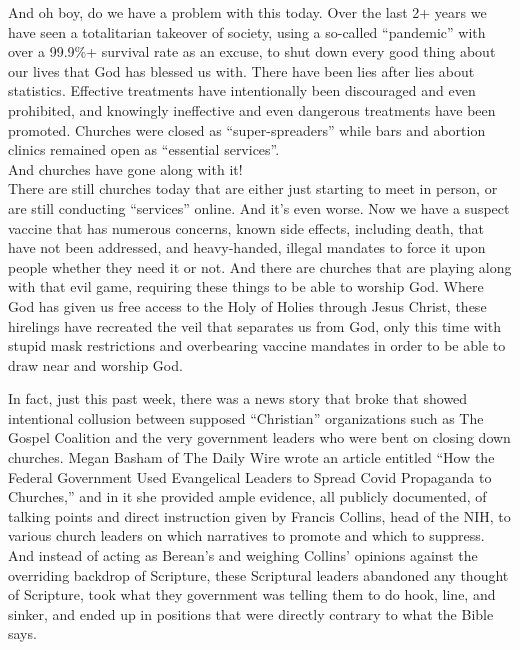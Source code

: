 \documentclass[letterpaper, 12pt]{article}
\begin{document}
    And oh boy, do we have a problem with this today. Over the last 2+
    years we have seen a totalitarian takeover of society, using a
    so-called ``pandemic'' with over a 99.9\%+ survival rate as an
    excuse, to shut down every good thing about our lives that God has
    blessed us with. There have been lies after lies about statistics.
    Effective treatments have intentionally been discouraged and even
    prohibited, and knowingly ineffective and even dangerous treatments
    have been promoted. Churches were closed as ``super-spreaders'' while bars and abortion
    clinics remained open as ``essential services''. \\

    And churches have gone along with it! \\

    There are still churches today that are either just starting to meet
    in person, or are still conducting ``services'' online. And it's
    even worse. Now we have a suspect vaccine that has numerous
    concerns, known side effects, including death, that have not been
    addressed, and heavy-handed, illegal mandates to force it upon
    people whether they need it or not. And there are churches that are
    playing along with that evil game, requiring these things to be able
    to worship God.  Where God has given us free access to the Holy of
    Holies through Jesus Christ, these hirelings have recreated the veil
    that separates us from God, only this time with stupid mask
    restrictions and overbearing vaccine mandates in order to be able to
    draw near and worship God. 

    In fact, just this past week, there was a news story that broke that
    showed intentional collusion between supposed ``Christian''
    organizations such as The Gospel Coalition and the very government
    leaders who were bent on closing down churches. Megan Basham of The
    Daily Wire wrote an article entitled ``How the Federal Government
    Used Evangelical Leaders to Spread Covid Propaganda to Churches,''
    and in it she provided ample evidence, all publicly documented, of
    talking points and direct instruction given by Francis Collins, head
    of the NIH, to various church leaders on which narratives to promote
    and which to suppress.  And instead of acting as Berean's and
    weighing Collins' opinions against the overriding backdrop of
    Scripture, these Scriptural leaders abandoned any thought of
    Scripture, took what they government was telling them to do hook,
    line, and sinker, and ended up in positions that were directly
    contrary to what the Bible says.
\end{document}
